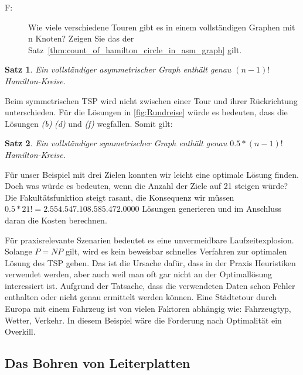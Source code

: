 \documentclass{article}
\newtheorem{mysat}{Satz}
\begin{document}
\begin{description}
	\item[F:] Wie viele verschiedene Touren gibt es in einem vollständigen Graphen mit n Knoten? Zeigen Sie das der Satz~\autoref{thm:count_of_hamilton_circle_in_asm_graph} gilt.
\end{description}

\begin{mysat}\label{thm:count_of_hamilton_circle_in_asm_graph}
	Ein vollständiger asymmetrischer Graph enthält genau $(n-1)!$ Hamilton-Kreise.
\end{mysat}

Beim symmetrischen TSP wird nicht zwischen einer Tour und ihrer Rückrichtung unterschieden. Für die Lösungen in \autoref{fig:Rundreise} würde es bedeuten, dass die Lösungen \textit{(b)} \textit{(d)} und \textit{(f)} wegfallen. Somit gilt:

\begin{mysat}
	Ein vollständiger symmetrischer Graph enthält genau $0.5 * (n-1)!$ Hamilton-Kreise.
\end{mysat}

Für unser Beispiel mit drei Zielen konnten wir leicht eine optimale Lösung finden. Doch was würde es bedeuten, wenn die Anzahl der Ziele auf 21 steigen würde? Die Fakultätsfunktion steigt rasant, die Konsequenz wir müssen $0.5 * 21! = 2.554.547.108.585.472.0000$ Lösungen generieren und im Anschluss daran die Kosten berechnen.

Für praxisrelevante Szenarien bedeutet es eine unvermeidbare Laufzeitexplosion. Solange $P = NP$ gilt, wird es kein beweisbar schnelles Verfahren zur optimalen Lösung des TSP geben. Das ist die Ursache dafür, dass in der Praxis Heuristiken verwendet werden, aber auch weil man oft gar nicht an der Optimallösung interessiert ist. Aufgrund der Tatsache, dass die verwendeten Daten schon Fehler enthalten oder nicht genau ermittelt werden können. Eine Städtetour durch Europa mit einem Fahrzeug ist von vielen Faktoren abhängig wie: Fahrzeugtyp, Wetter, Verkehr. In diesem Beispiel wäre die Forderung nach Optimalität ein Overkill.


\subsection{Das Bohren von Leiterplatten}
\end{document}
